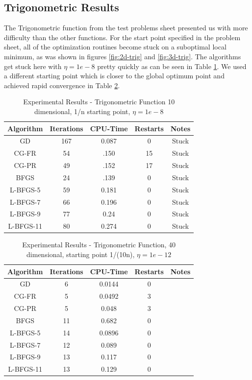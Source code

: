 \documentclass[12pt]{amsart}
\begin{document}
\subsection{Trigonometric Results}
The Trigonometric function from the test problems sheet presented us with more difficulty than the other functions.  For the start point specified in the problem sheet, all of the optimization routines become stuck on a suboptimal local minimum, as was shown in figures \ref{fig:2d-trig} and \ref{fig:3d-trig}.  The algorithms get stuck here with $\eta=1e-8$ pretty quickly as can be seen in Table \ref{results_trig_stuck}.  We used a different starting point which is closer to the global optimum point and achieved rapid convergence in Table \ref{results_trig_done}. 
\begin{table}
\caption{Experimental Results - Trigonometric Function 10 dimensional, 1/n starting point, $\eta=1e-8$}
\label{results_trig_stuck}
\begin{center}
\begin{tabular}{|c||c||c||c||c|}
\hline
Algorithm & Iterations & CPU-Time & Restarts & Notes\\
\hline
GD & 167 & 0.087 & 0 & Stuck\\
\hline
CG-FR & 54 & .150 & 15 & Stuck\\
\hline
CG-PR & 49 & .152 & 17 & Stuck\\
\hline
BFGS & 24 & .139 & 0 & Stuck\\
\hline
L-BFGS-5 & 59 & 0.181 & 0 & Stuck\\
\hline
L-BFGS-7 & 66 & 0.196 & 0 & Stuck\\
\hline
L-BFGS-9 & 77 & 0.24 & 0 & Stuck \\
\hline
L-BFGS-11 & 80 & 0.274 & 0 & Stuck\\
\hline
\end{tabular}
\end{center}
\end{table}
\begin{table}
\caption{Experimental Results - Trigonometric Function, 40 dimensional, starting point 1/(10n), $\eta=1e-12$}
\label{results_trig_done}
\begin{center}
\begin{tabular}{|c||c||c||c||c|}
\hline
Algorithm & Iterations & CPU-Time & Restarts & Notes\\
\hline
GD & 6 & 0.0144 & 0 & \\
\hline
CG-FR & 5 & 0.0492 & 3 & \\
\hline
CG-PR & 5 & 0.048 & 3 & \\
\hline
BFGS & 11 & 0.682 & 0 & \\
\hline
L-BFGS-5 & 14 & 0.0896 & 0 &\\
\hline
L-BFGS-7 & 12 & 0.089 & 0 &\\
\hline
L-BFGS-9 & 13 & 0.117 & 0 &\\
\hline
L-BFGS-11 & 13 & 0.129 & 0 &\\
\hline
\end{tabular}
\end{center}
\end{table}
\end{document}
